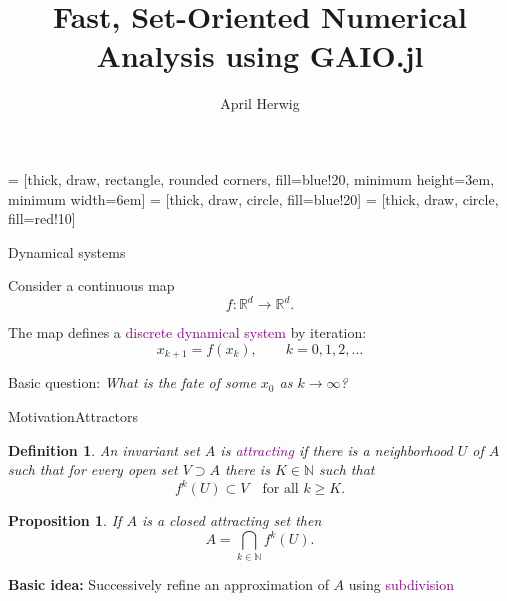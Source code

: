 \documentclass[
  english,            %
  aspectratio=169,    %
]{tumbeamer}
\title{Fast, Set-Oriented Numerical Analysis using GAIO.jl}
\author{April Herwig}
\institute{\theChairName\\\theDepartmentName\\\theUniversityName}
\date{}
\newtheorem{definition}{Definition}
\newtheorem{proposition}{Proposition}
\newenvironment{emphbox}
  {\begin{tcolorbox}[colback=blue!5!white,colframe=blue!75!black]}
  {\end{tcolorbox}}
\newcommand{\R}{{\mathbb R}}
\newcommand{\N}{{\mathbb N}}
\renewcommand{\emph}[1]{\textcolor{purple}{#1}}
\begin{document}
 = [thick, draw, rectangle, rounded corners, fill=blue!20,
                       minimum height=3em, minimum width=6em]
 = [thick, draw, circle, fill=blue!20]
 = [thick, draw, circle, fill=red!10]

\maketitle

\begin{frame}{Dynamical systems}

Consider a continuous map
\[
f:\R^d\to \R^d.
\] 

The map defines a \emph{discrete dynamical system} by iteration:
\[
x_{k+1} = f(x_k), \qquad k=0,1,2,\ldots
\]

\begin{tcolorbox}[colback=blue!5!white,colframe=blue!75!black]
Basic question: \textit{What is the fate of some $x_0$ as $k\to\infty$?}
\end{tcolorbox}



\end{frame}

\begin{frame}{Motivation}{Attractors}

\begin{definition}
    An invariant set $A$ is \emph{attracting} if there is a neighborhood $U$ of $A$ such that for every open set $V\supset A$ there is $K\in\N$ such that
    \[
    f^k(U)\subset V \quad\text{for all } k\ge K.
    \]
\end{definition}

\begin{proposition}
    If $A$ is a closed attracting set then
    \[
    A = \bigcap_{k\in\N} f^k(U).
    \]
\end{proposition}

\begin{emphbox}
    \textbf{Basic idea:} Successively refine an approximation of $A$ using \emph{subdivision}
\end{emphbox}

\end{frame}
\end{document}
